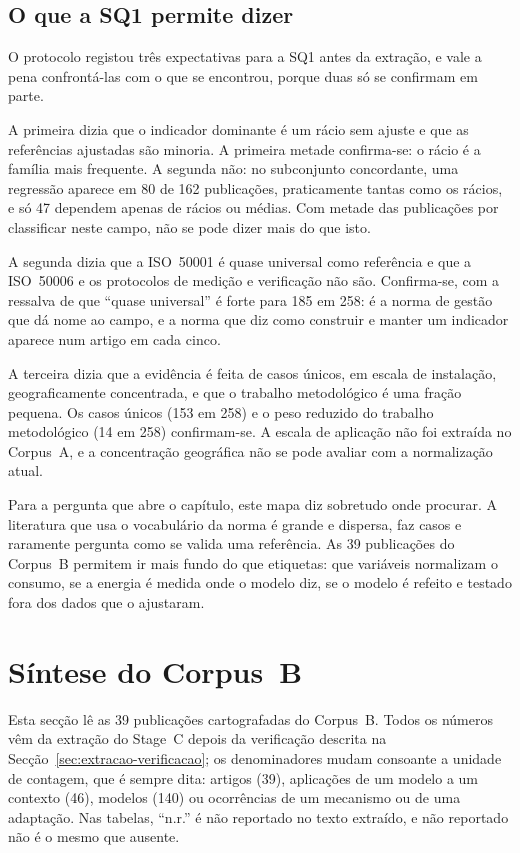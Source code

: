 \subsection{O que a SQ1 permite dizer}
\label{sec:sq1-sintese}

O protocolo registou três expectativas para a SQ1 antes da extração, e vale
a pena confrontá-las com o que se encontrou, porque duas só se confirmam em
parte.

A primeira dizia que o indicador dominante é um rácio sem ajuste e que as
referências ajustadas são minoria. A primeira metade confirma-se: o rácio é
a família mais frequente. A segunda não: no subconjunto concordante, uma
regressão aparece em 80 de 162 publicações, praticamente tantas como os
rácios, e só 47 dependem apenas de rácios ou médias. Com metade das
publicações por classificar neste campo, não se pode dizer mais do que isto.

A segunda dizia que a ISO~50001 é quase universal como referência e que a
ISO~50006 e os protocolos de medição e verificação não são. Confirma-se, com
a ressalva de que ``quase universal'' é forte para 185 em 258: é a norma de
gestão que dá nome ao campo, e a norma que diz como construir e manter um
indicador aparece num artigo em cada cinco.

A terceira dizia que a evidência é feita de casos únicos, em escala de
instalação, geograficamente concentrada, e que o trabalho metodológico é uma
fração pequena. Os casos únicos (153 em 258) e o peso reduzido do trabalho
metodológico (14 em 258) confirmam-se. A escala de aplicação não foi
extraída no Corpus~A, e a concentração geográfica não se pode avaliar com a
normalização atual.

Para a pergunta que abre o capítulo, este mapa diz sobretudo onde procurar.
A literatura que usa o vocabulário da norma é grande e dispersa, faz casos
e raramente pergunta como se valida uma referência. As 39 publicações do
Corpus~B permitem ir mais fundo do que etiquetas: que variáveis normalizam o
consumo, se a energia é medida onde o modelo diz, se o modelo é refeito e
testado fora dos dados que o ajustaram.

\section{Síntese do Corpus~B}
\label{sec:corpus-b}

Esta secção lê as 39 publicações cartografadas do Corpus~B. Todos os números
vêm da extração do Stage~C depois da verificação descrita na
Secção~\ref{sec:extracao-verificacao}; os denominadores mudam consoante a
unidade de contagem, que é sempre dita: artigos (39), aplicações de um
modelo a um contexto (46), modelos (140) ou ocorrências de um mecanismo ou de
uma adaptação. Nas tabelas, ``n.r.'' é não reportado no texto extraído, e
não reportado não é o mesmo que ausente.


